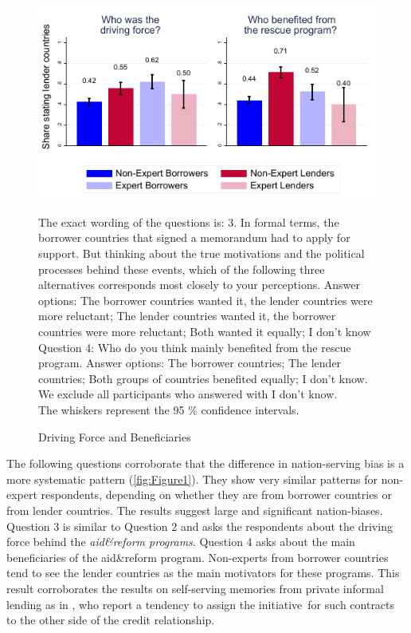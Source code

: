 \begin{figure}
    \begin{center}
      \caption{Driving Force and Beneficiaries}
    \includegraphics[scale=1.2]{graph3.pdf}
  
    \label{fig:figure2}
    \end{center}
    \tiny
    \begin{tablenotes} 
    {The exact wording of the questions is: 3. In formal terms, the borrower countries that signed a memorandum had to apply for support. But thinking about the true motivations and the political processes behind these events, which of the following three alternatives corresponds most closely to your perceptions. Answer options: The borrower countries wanted it, the lender countries were more reluctant; The lender countries wanted it, the borrower countries were more reluctant; Both wanted it equally; I don't know \\
   Question 4: Who do you think mainly benefited from the rescue program. Answer options: The borrower countries; The lender countries; Both groups of countries benefited equally; I don't know. We exclude all participants who answered with I don't know. \\
   The whiskers represent the 95 \% confidence intervals.}  
    \end{tablenotes}
\end{figure}
The following questions corroborate that the difference in nation-serving bias is a more systematic pattern (\autoref{fig:Figure1}). They show very similar patterns for non-expert
respondents, depending on whether they are from borrower countries or from
lender countries. The results suggest large and significant nation-biases. Question 3 is similar to Question 2 and asks the respondents about the driving force behind the \textit{aid\&reform programs}. Question 4 asks about the main beneficiaries of the aid&reform program. Non-experts
from borrower countries tend to see the lender countries as the main
motivators for these programs. This result corroborates the results on
self-serving memories from private informal lending as in \cite{dezso}, who report a tendency to assign the initiative\
for such contracts to the other side of the credit relationship. 

